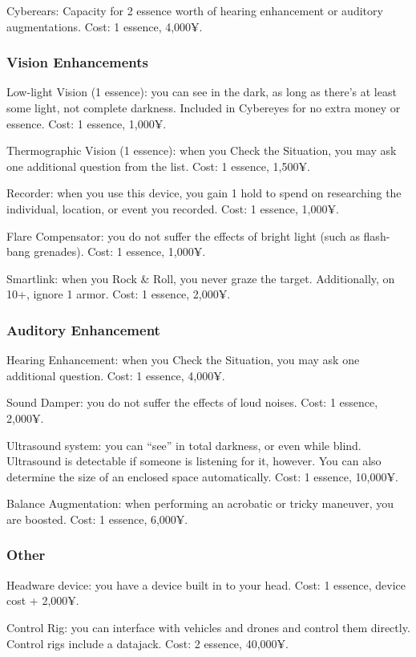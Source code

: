 Cyberears: Capacity for 2 essence worth of hearing enhancement or auditory augmentations. Cost: 1 essence, 4,000¥.

\subsubsection{Vision Enhancements}

Low-light Vision (1 essence): you can see in the dark, as long as there’s at least some light, not complete darkness. Included in Cybereyes for no extra money or essence. Cost: 1 essence, 1,000¥.

Thermographic Vision (1 essence): when you Check the Situation, you may ask one additional question from the list. Cost: 1 essence, 1,500¥.

Recorder: when you use this device, you gain 1 hold to spend on researching the individual, location, or event you recorded. Cost: 1 essence, 1,000¥.

Flare Compensator: you do not suffer the effects of bright light (such as flash-bang grenades). Cost: 1 essence, 1,000¥.

Smartlink: when you Rock \& Roll, you never graze the target. Additionally, on 10+, ignore 1 armor. Cost: 1 essence, 2,000¥.

\subsubsection{Auditory Enhancement}
Hearing Enhancement: when you Check the Situation, you may ask one additional question. Cost: 1 essence, 4,000¥.

Sound Damper: you do not suffer the effects of loud noises. Cost: 1 essence, 2,000¥.

Ultrasound system: you can “see” in total darkness, or even while blind. Ultrasound is detectable if someone is listening for it, however. You can also determine the size of an enclosed space automatically. Cost: 1 essence, 10,000¥.

Balance Augmentation: when performing an acrobatic or tricky maneuver, you are boosted. Cost: 1 essence, 6,000¥.

\subsubsection{Other}
Headware device: you have a device built in to your head. Cost: 1 essence, device cost + 2,000¥.

Control Rig: you can interface with vehicles and drones and control them directly. Control rigs include a datajack. Cost: 2 essence, 40,000¥.

